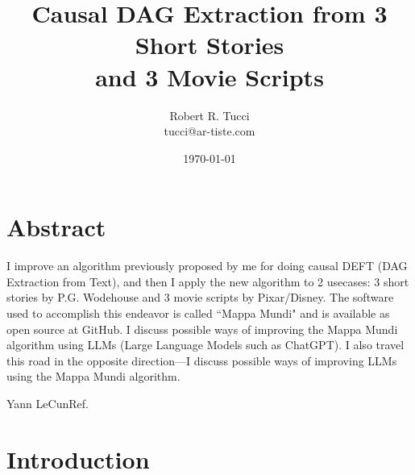 \documentclass[12pt]{article}
\begin{document}
\title{Causal DAG Extraction from 3 Short Stories  \\
and 3 Movie Scripts}
\date{ \today}
\author{Robert R. Tucci\\
        tucci@ar-tiste.com}
\maketitle
\vskip2cm
\section*{Abstract}
I improve an algorithm previously
proposed by me 
for doing causal DEFT (DAG Extraction from Text), and then I apply the new algorithm to 2 usecases:
3 short stories by P.G. Wodehouse and 3 movie scripts by Pixar/Disney. The software  used to accomplish this 
endeavor is called ``Mappa Mundi" and is available as open source at GitHub. 
I discuss possible ways of improving the Mappa Mundi algorithm 
using LLMs (Large
Language Models such as ChatGPT).
I also travel this road in the opposite direction---I discuss possible ways of improving
LLMs using the Mappa Mundi algorithm.
\newpage

{Yann LeCun}{Ref.\cite{yann-religion}}

\section{Introduction}
\end{document}
